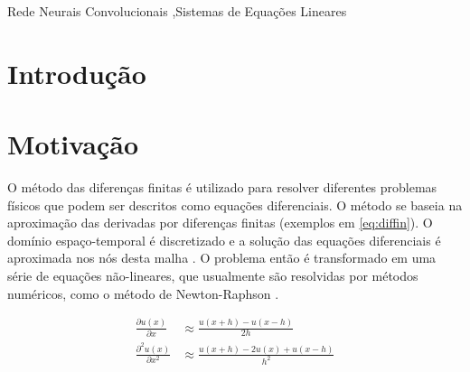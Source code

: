 \documentclass[final,5p]{elsarticle}
\numberwithin{equation}{section}
\begin{document}
\begin{frontmatter}


\begin{keyword}
    Rede Neurais Convolucionais \sep Sistemas de Equações Lineares



\end{keyword}

\end{frontmatter}

\section{Introdução}



\section{Motivação}

    O método das diferenças finitas é utilizado para resolver diferentes problemas físicos que podem ser descritos como equações diferenciais. O método se baseia na aproximação das derivadas por diferenças finitas (exemplos em \ref{eq:diffin}). O domínio espaço-temporal é discretizado e a solução das equações diferenciais é aproximada nos nós desta malha \cite{causon2010introductory}. O problema então é transformado em uma série de equações não-lineares, que usualmente são resolvidas por métodos numéricos, como o método de Newton-Raphson \cite{burden2016analise}.

    \begin{subequations}
        \begin{align}
            \frac{\partial u(x)}{\partial x} &\approx \frac{u(x+h) - u(x-h)}{2h} \\
            \frac{\partial^2 u(x)}{\partial x^2} &\approx \frac{u(x+h) - 2u(x) + u(x-h)}{h^2}
        \end{align}
        \label{eq:diffin}
    \end{subequations}
\end{document}
